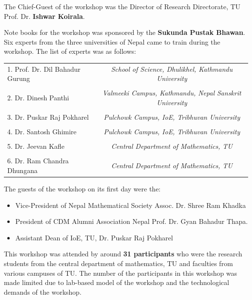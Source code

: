 \documentclass[a4paper,12pt]{report}
\begin{document}
\noindent
The Chief-Guest of the workshop was the Director of Research Directorate, TU Prof. Dr. \textbf{Ishwar Koirala}.
\clearpage

\noindent
Note books for the workshop was sponsored by the \textbf{Sukunda Pustak Bhawan}.\\
Six experts from the three universities of Nepal came to train during the workshop. The list of experts was as follows:

\begin{table}[h!]
\centering
  \begin{tcolorbox}[colframe=blue!52, colback=white, width=\linewidth]
\centering  \footnotesize
\begin{tabular}{l||c}

    1. Prof. Dr. Dil Bahadur Gurung &
    \textit{School of Science, Dhulikhel, Kathmandu University}\\
    \\
    2. Dr. Dinesh Panthi &
    \textit{Valmeeki Campus, Kathmandu, Nepal Sanskrit University}\\
    \\
    3. Dr. Puskar Raj Pokharel &
    \textit{Pulchowk Campus, IoE, Tribhuvan University}\\
    \\
    4. Dr. Santosh Ghimire&
    \textit{Pulchowk Campus, IoE, Tribhuvan University}\\
    \\
    5. Dr. Jeevan Kafle &
    \textit{Central Department of Mathematics, TU}\\
    \\
    6. Dr. Ram Chandra Dhungana &
    \textit{Central Department of Mathematics, TU}\\
    \end{tabular}
  \end{tcolorbox}
\end{table}

\noindent
The guests of the workshop on its first day were the:
\begin{itemize}
\item Vice-President of Nepal Mathematical Society Assoc. Dr. Shree Ram Khadka
\item President of CDM Alumni Association Nepal Prof. Dr. Gyan Bahadur Thapa.
\item Assistant Dean of IoE, TU, Dr. Puskar Raj Pokharel
\end{itemize}

\noindent
This workshop was attended by around \textbf{31 participants} who were the research students from the central department of mathematics, TU and faculties from various campuses of TU. The number of the participants in this workshop was made limited due to lab-based model of the workshop and the technological demands of the workshop.
\end{document}

